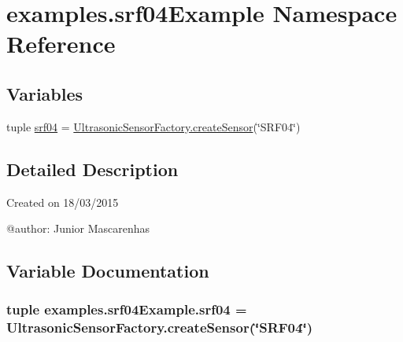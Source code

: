 \hypertarget{namespaceexamples_1_1srf04Example}{}\section{examples.\+srf04\+Example Namespace Reference}
\label{namespaceexamples_1_1srf04Example}
\subsection*{Variables}
\begin{DoxyCompactItemize}
\item 
tuple \hyperlink{namespaceexamples_1_1srf04Example_ade1fcf52de74516f9ebae9ac5c6f6cf7}{srf04} = \hyperlink{classconcretefactory_1_1ultrasonicSensorFactory_1_1UltrasonicSensorFactory_ade21ba1ce348eb9e5cf8eee3fda4a773}{Ultrasonic\+Sensor\+Factory.\+create\+Sensor}(\char`\"{}S\+R\+F04\char`\"{})
\end{DoxyCompactItemize}


\subsection{Detailed Description}
\begin{DoxyVerb}Created on 18/03/2015

@author: Junior Mascarenhas
\end{DoxyVerb}
 

\subsection{Variable Documentation}
\hypertarget{namespaceexamples_1_1srf04Example_ade1fcf52de74516f9ebae9ac5c6f6cf7}{}
\subsubsection[{srf04}]{\setlength{\rightskip}{0pt plus 5cm}tuple examples.\+srf04\+Example.\+srf04 = {\bf Ultrasonic\+Sensor\+Factory.\+create\+Sensor}(\char`\"{}S\+R\+F04\char`\"{})}\label{namespaceexamples_1_1srf04Example_ade1fcf52de74516f9ebae9ac5c6f6cf7}
